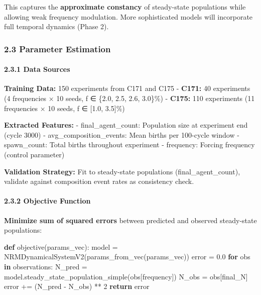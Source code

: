 \documentclass[
]{article}
\newenvironment{Shaded}{}{}
\newcommand{\ControlFlowTok}[1]{\textcolor[rgb]{0.00,0.44,0.13}{\textbf{#1}}}
\newcommand{\DecValTok}[1]{\textcolor[rgb]{0.25,0.63,0.44}{#1}}
\newcommand{\FloatTok}[1]{\textcolor[rgb]{0.25,0.63,0.44}{#1}}
\newcommand{\KeywordTok}[1]{\textcolor[rgb]{0.00,0.44,0.13}{\textbf{#1}}}
\newcommand{\NormalTok}[1]{#1}
\newcommand{\OperatorTok}[1]{\textcolor[rgb]{0.40,0.40,0.40}{#1}}
\newcommand{\StringTok}[1]{\textcolor[rgb]{0.25,0.44,0.63}{#1}}
\begin{document}
This captures the \textbf{approximate constancy} of steady-state
populations while allowing weak frequency modulation. More sophisticated
models will incorporate full temporal dynamics (Phase 2).

\subsubsection{2.3 Parameter Estimation}\label{parameter-estimation}

\paragraph{2.3.1 Data Sources}\label{data-sources}

\textbf{Training Data:} 150 experiments from C171 and C175 -
\textbf{C171:} 40 experiments (4 frequencies × 10 seeds, f ∈ \{2.0, 2.5,
2.6, 3.0\}\%) - \textbf{C175:} 110 experiments (11 frequencies × 10
seeds, f ∈ {[}1.0, 3.5{]}\%)

\textbf{Extracted Features:} - final\_agent\_count: Population size at
experiment end (cycle 3000) - avg\_composition\_events: Mean births per
100-cycle window - spawn\_count: Total births throughout experiment -
frequency: Forcing frequency (control parameter)

\textbf{Validation Strategy:} Fit to steady-state populations
(final\_agent\_count), validate against composition event rates as
consistency check.

\paragraph{2.3.2 Objective Function}\label{objective-function}

\textbf{Minimize sum of squared errors} between predicted and observed
steady-state populations:

\begin{Shaded}
\begin{Highlighting}[]
\KeywordTok{def}\NormalTok{ objective(params\_vec):}
\NormalTok{    model }\OperatorTok{=}\NormalTok{ NRMDynamicalSystemV2(params\_from\_vec(params\_vec))}
\NormalTok{    error }\OperatorTok{=} \FloatTok{0.0}
    \ControlFlowTok{for}\NormalTok{ obs }\KeywordTok{in}\NormalTok{ observations:}
\NormalTok{        N\_pred }\OperatorTok{=}\NormalTok{ model.steady\_state\_population\_simple(obs[}\StringTok{\textquotesingle{}frequency\textquotesingle{}}\NormalTok{])}
\NormalTok{        N\_obs }\OperatorTok{=}\NormalTok{ obs[}\StringTok{\textquotesingle{}final\_N\textquotesingle{}}\NormalTok{]}
\NormalTok{        error }\OperatorTok{+=}\NormalTok{ (N\_pred }\OperatorTok{{-}}\NormalTok{ N\_obs) }\OperatorTok{**} \DecValTok{2}
    \ControlFlowTok{return}\NormalTok{ error}
\end{Highlighting}
\end{Shaded}
\end{document}
